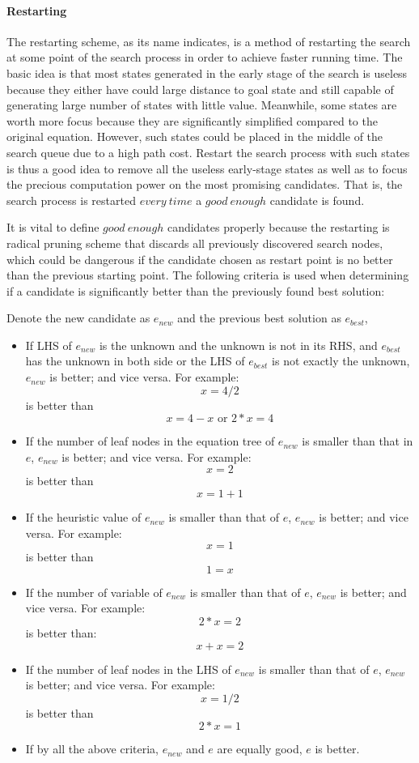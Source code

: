 \documentclass{article}
\begin{document}
\paragraph{Restarting} The restarting scheme, as its name indicates, is a method of restarting the search at some point of the search process in order to achieve faster running time. The basic idea is that most states generated in the early stage of the search is useless because they either have could large distance to goal state and still capable of generating large number of states with little value. Meanwhile, some states are worth more focus because they are significantly simplified compared to the original equation. However, such states could be placed in the middle of the search queue due to a high path cost. Restart the search process with such states is thus a good idea to remove all the useless early-stage states as well as to focus the precious computation power on the most promising candidates. That is, the search process is restarted $every~time$ a $good~enough$ candidate is found.

It is vital to define $good~enough$ candidates properly because the restarting is radical pruning scheme that discards all previously discovered search nodes, which could be dangerous if the candidate chosen as restart point is no better than the previous starting point. The following criteria is used when determining if a candidate is significantly better than the previously found best solution:

Denote the new candidate as $e_{new}$ and the previous best solution as $e_{best}$,
\begin{itemize}
\item If LHS of $e_{new}$ is the unknown and the unknown is not in its RHS, and $e_{best}$ has the unknown in both side or the LHS of $e_{best}$ is not exactly the unknown, $e_{new}$ is better; and vice versa. For example:
\[x=4/2\]
is better than
\[x=4-x\text{~or~}2*x=4\] 
\item If the number of leaf nodes in the equation tree of $e_{new}$ is smaller than that in $e$, $e_{new}$ is better; and vice versa. For example:
\[x=2\]
is better than
\[x=1+1\]
\item If the heuristic value of $e_{new}$ is smaller than that of $e$, $e_{new}$ is better; and vice versa. For example:
\[x=1\]
is better than
\[1=x\]
\item If the number of variable of $e_{new}$ is smaller than that of $e$, $e_{new}$ is better; and vice versa. For example:
\[2*x = 2\]
is better than:
\[x + x = 2\]
\item If the number of leaf nodes in the LHS of $e_{new}$ is smaller than that of $e$, $e_{new}$ is better; and vice versa. For example:
\[x = 1/2\]
is better than
\[2*x = 1\]
\item If by all the above criteria, $e_{new}$ and $e$ are equally good, $e$ is better.
\end{itemize}
\end{document}
